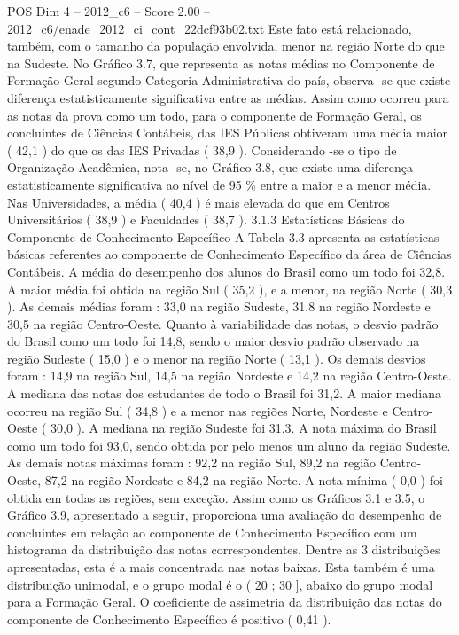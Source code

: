\begin{textsample}{POS Dim 4 – 2012\_c6 – Score 2.00 – 2012\_c6/enade\_2012\_ci\_cont\_22dcf93b02.txt}
Este fato está relacionado, também, com o tamanho da população envolvida, menor na região Norte do que na Sudeste.
No Gráfico 3.7, que representa as notas médias no Componente de Formação Geral segundo Categoria Administrativa do país, observa -se que existe diferença estatisticamente significativa entre as médias.
Assim como ocorreu para as notas da prova como um todo, para o componente de Formação Geral, os concluintes de Ciências Contábeis, das IES Públicas obtiveram uma média maior ( 42,1 ) do que os das IES Privadas ( 38,9 ).
Considerando -se o tipo de Organização Acadêmica, nota -se, no Gráfico 3.8, que existe uma diferença estatisticamente significativa ao nível de 95 \% entre a maior e a menor média.
Nas Universidades, a média ( 40,4 ) é mais elevada do que em Centros Universitários ( 38,9 ) e Faculdades ( 38,7 ). 3.1.3 Estatísticas Básicas do Componente de Conhecimento Específico A Tabela 3.3 apresenta as estatísticas básicas referentes ao componente de Conhecimento Específico da área de Ciências Contábeis.
A média do desempenho dos alunos do Brasil como um todo foi 32,8.
A maior média foi obtida na região Sul ( 35,2 ), e a menor, na região Norte ( 30,3 ).
As demais médias foram : 33,0 na região Sudeste, 31,8 na região Nordeste e 30,5 na região Centro-Oeste.
Quanto à variabilidade das notas, o desvio padrão do Brasil como um todo foi 14,8, sendo o maior desvio padrão observado na região Sudeste ( 15,0 ) e o menor na região Norte ( 13,1 ).
Os demais desvios foram : 14,9 na região Sul, 14,5 na região Nordeste e 14,2 na região Centro-Oeste.
A mediana das notas dos estudantes de todo o Brasil foi 31,2.
A maior mediana ocorreu na região Sul ( 34,8 ) e a menor nas regiões Norte, Nordeste e Centro-Oeste ( 30,0 ).
A mediana na região Sudeste foi 31,3.
A nota máxima do Brasil como um todo foi 93,0, sendo obtida por pelo menos um aluno da região Sudeste.
As demais notas máximas foram : 92,2 na região Sul, 89,2 na região Centro-Oeste, 87,2 na região Nordeste e 84,2 na região Norte.
A nota mínima ( 0,0 ) foi obtida em todas as regiões, sem exceção.
Assim como os Gráficos 3.1 e 3.5, o Gráfico 3.9, apresentado a seguir, proporciona uma avaliação do desempenho de concluintes em relação ao componente de Conhecimento Específico com um histograma da distribuição das notas correspondentes.
Dentre as 3 distribuições apresentadas, esta é a mais concentrada nas notas baixas.
Esta também é uma distribuição unimodal, e o grupo modal é o ( 20 ; 30 ], abaixo do grupo modal para a Formação Geral.
O coeficiente de assimetria da distribuição das notas do componente de Conhecimento Específico é positivo ( 0,41 ).

\end{textsample}

